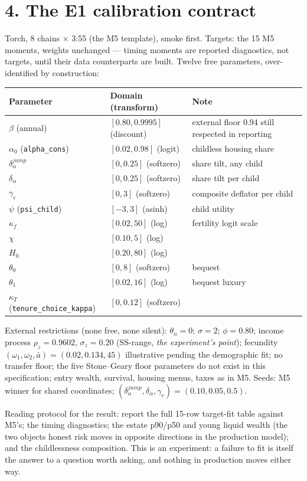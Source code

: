 \documentclass[11pt]{article}
\begin{document}
\section*{4. The E1 calibration contract}

Torch, 8 chains $\times$ 3:55 (the M5 template), smoke first. Targets: the
15 M5 moments, weights unchanged --- timing moments are reported
diagnostics, not targets, until their data counterparts are built.
Twelve free parameters, over-identified by construction:

\begin{center}\small
\begin{tabular}{lll}
\toprule
Parameter & Domain (transform) & Note \\
\midrule
$\beta$ (annual) & $[0.80, 0.9995]$ (discount) & external floor 0.94 still respected in reporting \\
$\alpha_0$ (\texttt{alpha\_cons}) & $[0.02, 0.98]$ (logit) & childless housing share \\
$\delta_\alpha^{jump}$ & $[0, 0.25]$ (softzero) & share tilt, any child \\
$\delta_\alpha$ & $[0, 0.25]$ (softzero) & share tilt per child \\
$\gamma_e$ & $[0, 3]$ (softzero) & composite deflator per child \\
$\psi$ (\texttt{psi\_child}) & $[-3, 3]$ (asinh) & child utility \\
$\kappa_f$ & $[0.02, 50]$ (log) & fertility logit scale \\
$\chi$ & $[0.10, 5]$ (log) & \\
$H_0$ & $[0.20, 80]$ (log) & \\
$\theta_0$ & $[0, 8]$ (softzero) & bequest \\
$\theta_1$ & $[0.02, 16]$ (log) & bequest luxury \\
$\kappa_T$ (\texttt{tenure\_choice\_kappa}) & $[0, 0.12]$ (softzero) & \\
\bottomrule
\end{tabular}
\end{center}

External restrictions (none free, none silent): $\theta_n=0$; $\sigma=2$;
$\phi=0.80$; income process $\rho_z=0.9602$, $\sigma_z=0.20$ (SS-range,
\emph{the experiment's point}); fecundity $(\omega_1,\omega_2,\bar a)=
(0.02, 0.134, 45)$ illustrative pending the demographic fit; no transfer
floor; the five Stone--Geary floor parameters do not exist in this
specification; entry wealth, survival, housing menus, taxes as in M5.
Seeds: M5 winner for shared coordinates; $(\delta_\alpha^{jump},
\delta_\alpha, \gamma_e) = (0.10, 0.05, 0.5)$.

Reading protocol for the result: report the full 15-row target-fit table
against M5's; the timing diagnostics; the estate p90/p50 and young liquid
wealth (the two objects honest risk moves in opposite directions in the
production model); and the childlessness composition. This is an
experiment: a failure to fit is itself the answer to a question worth
asking, and nothing in production moves either way.
\end{document}
